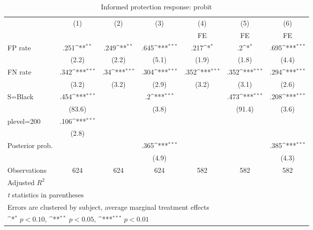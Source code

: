 \begin{table}[htbp]\centering
\def\sym#1{\ifmmode^{#1}\else\(^{#1}\)\fi}
\caption{Informed protection response: probit}
\begin{tabular}{l*{6}{c}}
\hline\hline
                &\multicolumn{1}{c}{(1)}&\multicolumn{1}{c}{(2)}&\multicolumn{1}{c}{(3)}&\multicolumn{1}{c}{(4)}&\multicolumn{1}{c}{(5)}&\multicolumn{1}{c}{(6)}\\
                &\multicolumn{1}{c}{}&\multicolumn{1}{c}{}&\multicolumn{1}{c}{}&\multicolumn{1}{c}{FE}&\multicolumn{1}{c}{FE}&\multicolumn{1}{c}{FE}\\
\hline
FP rate         &     .251\sym{**} &     .249\sym{**} &     .645\sym{***}&     .217\sym{*}  &       .2\sym{*}  &     .695\sym{***}\\
                &    (2.2)         &    (2.2)         &    (5.1)         &    (1.9)         &    (1.8)         &    (4.4)         \\
FN rate         &     .342\sym{***}&      .34\sym{***}&     .304\sym{***}&     .352\sym{***}&     .352\sym{***}&     .294\sym{***}\\
                &    (3.2)         &    (3.2)         &    (2.9)         &    (3.2)         &    (3.1)         &    (2.6)         \\
S=Black         &     .454\sym{***}&                  &       .2\sym{***}&                  &     .473\sym{***}&     .208\sym{***}\\
                &   (83.6)         &                  &    (3.8)         &                  &   (91.4)         &    (3.6)         \\
plevel=200      &     .106\sym{***}&                  &                  &                  &                  &                  \\
                &    (2.8)         &                  &                  &                  &                  &                  \\
Posterior prob. &                  &                  &     .365\sym{***}&                  &                  &     .385\sym{***}\\
                &                  &                  &    (4.9)         &                  &                  &    (4.3)         \\
\hline
Observations    &      624         &      624         &      624         &      582         &      582         &      582         \\
Adjusted \(R^{2}\)&                  &                  &                  &                  &                  &                  \\
\hline\hline
\multicolumn{7}{l}{\footnotesize \textit{t} statistics in parentheses}\\
\multicolumn{7}{l}{\footnotesize Errors are clustered by subject, average marginal treatment effects}\\
\multicolumn{7}{l}{\footnotesize \sym{*} \(p<0.10\), \sym{**} \(p<0.05\), \sym{***} \(p<0.01\)}\\
\end{tabular}
\end{table}
